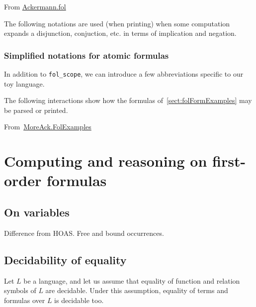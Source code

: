 \noindent From \href{../theories/html/hydras.Ackermann.fol.html}{Ackermann.fol}


The following notations are used (when printing) when  some computation 
    expands a disjunction, conjuction, etc. 
    in terms of implication and negation.


\subsubsection{Simplified notations for atomic formulas}
\label{sec:fol-atomic-notations}

In addition to \texttt{fol\_scope}, we can introduce a few abbreviations specific to our toy language.


The following interactions show how the formulas 
of~\ref{sect:folFormExamples} may be 
parsed or printed. 

\noindent From~\href{../theories/html/hydras.MoreAck.FolExamples.html}{MoreAck.FolExamples}

\vspace{6pt}





\section{Computing and reasoning on first-order formulas}

\subsection{On variables}

\begin{todo}
  Difference from HOAS. Free and bound occurrences.
\end{todo}

\subsection{Decidability of equality}
Let $L$ be a language, and let us assume that equality 
of function and relation symbols of $L$ are decidable.
Under this assumption, equality of terms and formulas over $L$ is decidable too.

